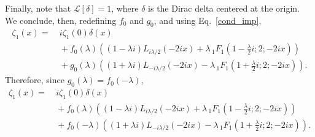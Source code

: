 \documentclass[%
 aip,
 jmp,%
 amsmath,amssymb,
 reprint,%
]{revtex4-2}
\begin{document}
Finally, note that $\mathcal L[\delta] =1$, where $\delta$ is the Dirac delta centered at the origin. We conclude, then, redefining $f_0$ and $g_0$, and using Eq.~\eqref{cond_imp},
\[
\begin{aligned}
\zeta_1(x)= &~{}i \zeta_1(0)\delta(x) \\%
&~{} + f_0(\lambda) \left(  (1-\lambda i)  L_{i \lambda/2}(-2 i x)  + \lambda \, _1F_1\left(1- \frac{\lambda}2 i ;2;-2 i x \right) \right)\\
&~{} + g_0(\lambda) \left( (1+ \lambda i)L_{-i \lambda/2}(-2 i x) - \lambda \, _1F_1\left(1+  \frac{\lambda}2i ;2;-2 i x \right)\right).
\end{aligned}
\]
Therefore, since $g_0(\lambda)=f_0(-\lambda)$,
\begin{equation}\label{eq:sol-zeta1(x)}
\begin{aligned}
\zeta_1(x)= &~{}i \zeta_1(0)\delta(x) \\%
&~{} + f_0(\lambda) \left(  (1-\lambda i)  L_{i \lambda/2}(-2 i x)  +\lambda \, _1F_1\left(1- \frac{\lambda}2 i ;2;-2 i x \right) \right)\\
&~{} + f_0(-\lambda) \left( (1+ \lambda i)L_{-i \lambda/2}(-2 i x) - \lambda \, _1F_1\left(1+  \frac{\lambda}2i ;2;-2 i x \right)\right).
\end{aligned}
\end{equation}
\end{document}
